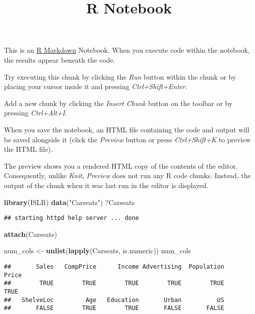\documentclass[
]{article}
\title{R Notebook}
\author{}
\date{\vspace{-2.5em}}
\newenvironment{Shaded}{\begin{snugshade}}{\end{snugshade}}
\newcommand{\KeywordTok}[1]{\textcolor[rgb]{0.13,0.29,0.53}{\textbf{#1}}}
\newcommand{\NormalTok}[1]{#1}
\newcommand{\StringTok}[1]{\textcolor[rgb]{0.31,0.60,0.02}{#1}}
\begin{document}
\maketitle

This is an \href{http://rmarkdown.rstudio.com}{R Markdown} Notebook.
When you execute code within the notebook, the results appear beneath
the code.

Try executing this chunk by clicking the \emph{Run} button within the
chunk or by placing your cursor inside it and pressing
\emph{Ctrl+Shift+Enter}.

Add a new chunk by clicking the \emph{Insert Chunk} button on the
toolbar or by pressing \emph{Ctrl+Alt+I}.

When you save the notebook, an HTML file containing the code and output
will be saved alongside it (click the \emph{Preview} button or press
\emph{Ctrl+Shift+K} to preview the HTML file).

The preview shows you a rendered HTML copy of the contents of the
editor. Consequently, unlike \emph{Knit}, \emph{Preview} does not run
any R code chunks. Instead, the output of the chunk when it was last run
in the editor is displayed.

\begin{Shaded}
\begin{Highlighting}[]
\KeywordTok{library}\NormalTok{(ISLR)}
\KeywordTok{data}\NormalTok{(}\StringTok{"Carseats"}\NormalTok{)}
\NormalTok{?Carseats}
\end{Highlighting}
\end{Shaded}

\begin{verbatim}
## starting httpd help server ... done
\end{verbatim}

\begin{Shaded}
\begin{Highlighting}[]
\KeywordTok{attach}\NormalTok{(Carseats)}


\NormalTok{num_cols <-}\StringTok{ }\KeywordTok{unlist}\NormalTok{(}\KeywordTok{lapply}\NormalTok{(Carseats, is.numeric))  }
\NormalTok{num_cols}
\end{Highlighting}
\end{Shaded}

\begin{verbatim}
##       Sales   CompPrice      Income Advertising  Population       Price 
##        TRUE        TRUE        TRUE        TRUE        TRUE        TRUE 
##   ShelveLoc         Age   Education       Urban          US 
##       FALSE        TRUE        TRUE       FALSE       FALSE
\end{verbatim}
\end{document}
